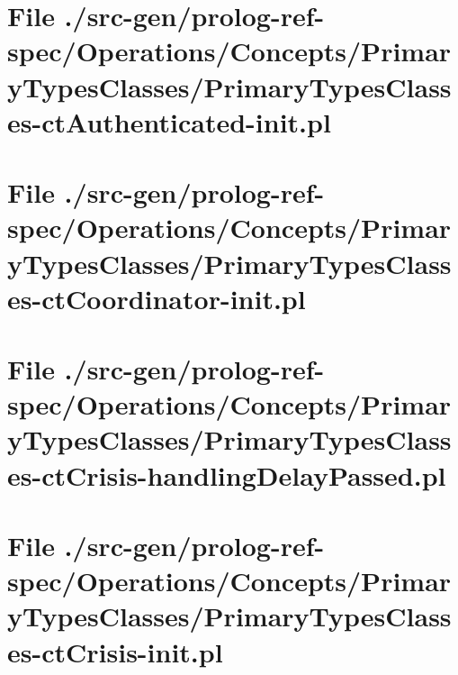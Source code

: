 \section[File /src-gen/prolog-ref-spec.../PrimaryTypesClasses-ctAuthenticated-init.pl]{File ./src-gen/prolog-ref-spec/Operations/Concepts/PrimaryTypesClasses/PrimaryTypesClasses-ctAuthenticated-init.pl}
\scriptsize

\normalsize
	
\section[File /src-gen/prolog-ref-spec.../PrimaryTypesClasses-ctCoordinator-init.pl]{File ./src-gen/prolog-ref-spec/Operations/Concepts/PrimaryTypesClasses/PrimaryTypesClasses-ctCoordinator-init.pl}
\scriptsize

\normalsize
	
\section[File /src-gen.../PrimaryTypesClasses-ctCrisis-handlingDelayPassed.pl]{File ./src-gen/prolog-ref-spec/Operations/Concepts/PrimaryTypesClasses/PrimaryTypesClasses-ctCrisis-handlingDelayPassed.pl}
\scriptsize

\normalsize
	
\section[File /src-gen/prolog-ref-spec.../PrimaryTypesClasses-ctCrisis-init.pl]{File ./src-gen/prolog-ref-spec/Operations/Concepts/PrimaryTypesClasses/PrimaryTypesClasses-ctCrisis-init.pl}
\scriptsize

\normalsize
	
